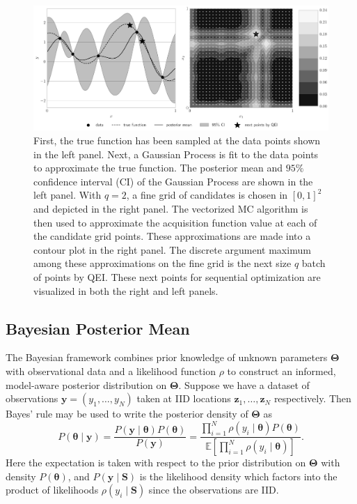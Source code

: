 \documentclass[graybox]{svmult}
\begin{document}
\begin{figure}[t]
    \centering
    \includegraphics[width=\textwidth]{figs/gp.pdf}
    \caption{First, the true function has been sampled at the data points shown in the left panel. Next, a Gaussian Process is fit to the data points to approximate the true function. The posterior mean and $95\%$ confidence interval (CI) of the Gaussian Process are shown in the left panel. With $q=2$, a fine grid of candidates is chosen in $[0,1]^{2}$ and depicted in the right panel. The vectorized MC algorithm is then used to approximate the acquisition function value at each of the candidate grid points. These approximations are made into a contour plot in the right panel. The discrete argument maximum among these approximations on the fine grid is the next size $q$ batch of points by QEI. These next points for sequential optimization are visualized in both the right and left panels. }
    \label{SoRa_fig:bo_qei}
\end{figure}

\subsection{Bayesian Posterior Mean}

The Bayesian framework combines prior knowledge of unknown parameters $\boldsymbol{\Theta}$ with observational data and a likelihood function $\rho$ to construct an informed, model-aware posterior distribution on $\boldsymbol{\Theta}$. Suppose we have a dataset of observations $\boldsymbol{y} = (y_1,\dots,y_{N})$ taken at IID locations $\boldsymbol{z}_1,\dots,\boldsymbol{z}_{N}$ respectively. Then Bayes' rule may be used to write the posterior density of $\boldsymbol{\Theta}$ as 
$$P\left(\boldsymbol{\theta} \mid \boldsymbol{y} \right) = \frac{P(\boldsymbol{y} \mid \boldsymbol{\theta}) P(\boldsymbol{\theta})}{P\left(\boldsymbol{y}\right)} = \frac{\prod_{i=1}^{N} \rho(y_i \mid \boldsymbol{\theta}) P(\boldsymbol{\theta})}{\mathbb{E}\left[\prod_{i=1}^{N} \rho(y_i \mid \boldsymbol{\theta})\right]}.$$
Here the expectation is taken with respect to the prior distribution on $\boldsymbol{\Theta}$ with density $P(\boldsymbol{\theta})$, and $P\left(\boldsymbol{y} \mid \boldsymbol{S} \right)$ is the likelihood density which factors into the product of likelihoods $\rho(y_i \mid \boldsymbol{S})$ since the observations are IID. 
\end{document}
